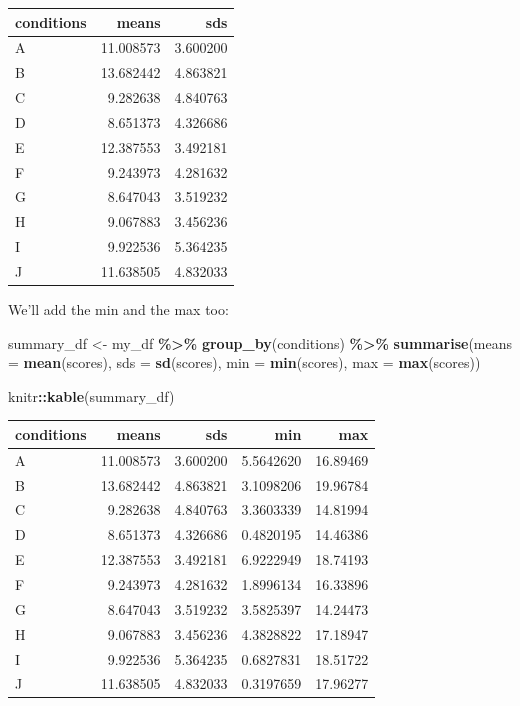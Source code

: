 \documentclass[
]{book}
\newenvironment{Shaded}{\begin{snugshade}}{\end{snugshade}}
\newcommand{\AttributeTok}[1]{\textcolor[rgb]{0.13,0.29,0.53}{#1}}
\newcommand{\FunctionTok}[1]{\textcolor[rgb]{0.13,0.29,0.53}{\textbf{#1}}}
\newcommand{\NormalTok}[1]{#1}
\newcommand{\OtherTok}[1]{\textcolor[rgb]{0.56,0.35,0.01}{#1}}
\newcommand{\SpecialCharTok}[1]{\textcolor[rgb]{0.81,0.36,0.00}{\textbf{#1}}}
\begin{document}
\begin{tabular}{l|r|r}
\hline
conditions & means & sds\\
\hline
A & 11.008573 & 3.600200\\
\hline
B & 13.682442 & 4.863821\\
\hline
C & 9.282638 & 4.840763\\
\hline
D & 8.651373 & 4.326686\\
\hline
E & 12.387553 & 3.492181\\
\hline
F & 9.243973 & 4.281632\\
\hline
G & 8.647043 & 3.519232\\
\hline
H & 9.067883 & 3.456236\\
\hline
I & 9.922536 & 5.364235\\
\hline
J & 11.638505 & 4.832033\\
\hline
\end{tabular}

We'll add the min and the max too:

\begin{Shaded}
\begin{Highlighting}[]
\NormalTok{summary\_df }\OtherTok{\textless{}{-}}\NormalTok{ my\_df }\SpecialCharTok{\%\textgreater{}\%}
               \FunctionTok{group\_by}\NormalTok{(conditions) }\SpecialCharTok{\%\textgreater{}\%}
               \FunctionTok{summarise}\NormalTok{(}\AttributeTok{means =} \FunctionTok{mean}\NormalTok{(scores),}
                         \AttributeTok{sds =} \FunctionTok{sd}\NormalTok{(scores),}
                         \AttributeTok{min =} \FunctionTok{min}\NormalTok{(scores),}
                         \AttributeTok{max =} \FunctionTok{max}\NormalTok{(scores))}

\NormalTok{knitr}\SpecialCharTok{::}\FunctionTok{kable}\NormalTok{(summary\_df)}
\end{Highlighting}
\end{Shaded}

\begin{tabular}{l|r|r|r|r}
\hline
conditions & means & sds & min & max\\
\hline
A & 11.008573 & 3.600200 & 5.5642620 & 16.89469\\
\hline
B & 13.682442 & 4.863821 & 3.1098206 & 19.96784\\
\hline
C & 9.282638 & 4.840763 & 3.3603339 & 14.81994\\
\hline
D & 8.651373 & 4.326686 & 0.4820195 & 14.46386\\
\hline
E & 12.387553 & 3.492181 & 6.9222949 & 18.74193\\
\hline
F & 9.243973 & 4.281632 & 1.8996134 & 16.33896\\
\hline
G & 8.647043 & 3.519232 & 3.5825397 & 14.24473\\
\hline
H & 9.067883 & 3.456236 & 4.3828822 & 17.18947\\
\hline
I & 9.922536 & 5.364235 & 0.6827831 & 18.51722\\
\hline
J & 11.638505 & 4.832033 & 0.3197659 & 17.96277\\
\hline
\end{tabular}
\end{document}
